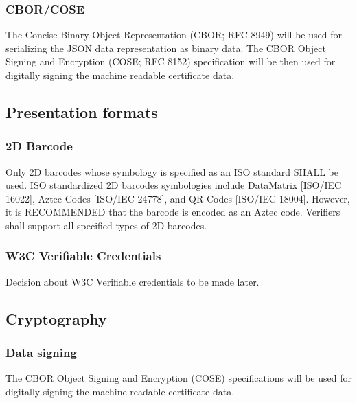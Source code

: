 \documentclass[a4paper,12pt,english]{sphinxhowto}
\begin{document}
\subsubsection{CBOR/COSE}
\label{\detokenize{ssi/annotehealth:cbor-cose}}
\sphinxAtStartPar
The Concise Binary Object Representation (CBOR; RFC 8949) will be used for serializing the JSON data representation as binary data. The CBOR Object Signing and Encryption (COSE; RFC 8152) specification will be then used for digitally signing the machine readable certificate data.


\subsection{Presentation formats}
\label{\detokenize{ssi/annotehealth:presentation-formats}}

\subsubsection{2D Barcode}
\label{\detokenize{ssi/annotehealth:d-barcode}}
\sphinxAtStartPar
Only 2D barcodes whose symbology is specified as an ISO standard SHALL be used. ISO standardized 2D barcodes symbologies include DataMatrix {[}ISO/IEC 16022{]}, Aztec Codes {[}ISO/IEC 24778{]}, and QR Codes {[}ISO/IEC 18004{]}. However, it is RECOMMENDED that the barcode is encoded as an Aztec code. Verifiers shall support all specified types of 2D barcodes.


\subsubsection{W3C Verifiable Credentials}
\label{\detokenize{ssi/annotehealth:w3c-verifiable-credentials}}
\sphinxAtStartPar
Decision about W3C Verifiable credentials to be made later.


\subsection{Cryptography}
\label{\detokenize{ssi/annotehealth:cryptography}}

\subsubsection{Data signing}
\label{\detokenize{ssi/annotehealth:data-signing}}
\sphinxAtStartPar
The CBOR Object Signing and Encryption (COSE) specifications will be used for digitally signing the machine readable certificate data.
\end{document}
